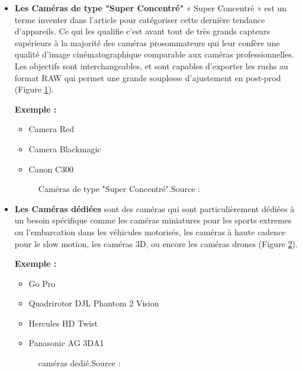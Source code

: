 \begin{itemize}
 	\item \textbf{Les Caméras de type "Super Concentré"} « Super Concentré » est un terme inventer dans l'article\cite{noauthor_les_2015} pour catégoriser cette dernière tendance d’appareils. Ce qui les qualifie c’est avant tout de très grands capteurs supérieurs à la majorité des caméras prosommateurs qui leur confère une qualité d’image cinématographique comparable aux caméras professionnelles. Les objectifs sont interchangeables, et sont capables d’exporter les rushs au format RAW qui permet une grande souplesse d’ajustement en post-prod (Figure \ref{fig:Caméras de type "Super Concentré"}).
 	
 	\textbf{Exemple :}
 	\begin{itemize}
 		\item Camera Red
 		\item Camera Blackmagic
 		\item Canon C300
 	\end{itemize}
 	 
 	 \begin{figure}[H]%
 	 	\center%
 	 	\setlength{\fboxsep}{5pt}%
 	 	\setlength{\fboxrule}{0.5pt}%
 	 \caption[Caméras de type "Super Concentré" ]{Caméras de type "Super Concentré".Source :\cite{noauthor_les_2015}}
 	 \label{fig:Caméras de type "Super Concentré"}
 	 \end{figure}
 	 
 	\item \textbf{Les Caméras dédiées} sont des caméras qui sont particulièrement dédiées à un besoin spécifique comme les caméras miniatures pour les sports extremes ou l’embarcation dans les véhicules motorisés, les caméras à haute cadence pour le slow motion, les caméras 3D, ou encore les caméras drones (Figure \ref{fig:Caméras dedié}).
 	
 	\textbf{Exemple :}
 	
 	\begin{itemize}
 		\item Go Pro
 		\item Quadrirotor DJL Phantom 2 Vision
 		\item Hercules HD Twist
 		\item Panasonic AG 3DA1
 	\end{itemize}
 	
 	\begin{figure}[H]%
 		\center%
 		\setlength{\fboxsep}{5pt}%
 		\setlength{\fboxrule}{0.5pt}%
 		\caption[Caméras dedié]{caméras dedié.Source :\cite{noauthor_les_2015}}
 	\label{fig:Caméras dedié}
 	\end{figure}
 	
 \end{itemize}
 
